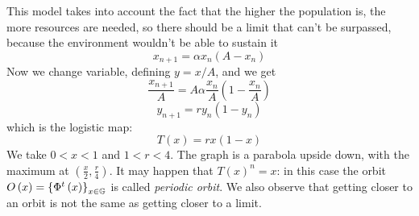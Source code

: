 This model takes into account the fact that the higher the population is, the more resources are needed, so there should be a limit that can't be surpassed, because the environment wouldn't be able to sustain it
$$
	x_{n+1} = \alpha x_n(A-x_n)
$$
Now we change variable, defining $y = x/A$, and we get
$$
	\frac{x_{n+1}}{A} = A\alpha \frac{x_n}{A}\left(1 - \frac{x_n}{A}\right)
$$
$$
	y_{n+1} = r y_n(1-y_n)
$$
which is the logistic map:
\begin{equation}
	T(x) = rx(1-x)
\end{equation}
We take $0 < x < 1$ and $1 < r < 4$. The graph is a parabola upside down, with the maximum at $\left(\frac{x}{2},\frac{r}{4}\right)$.
It may happen that $T\left(x\right)^n=x$: in this case the orbit $O\left(x\right)=\left\lbrace\Phi^t\left(x\right)\right\rbrace_{x \in \mathbb{G}}$ is called \emph{periodic orbit}.
We also observe that getting closer to an orbit is not the same as getting closer to a limit.